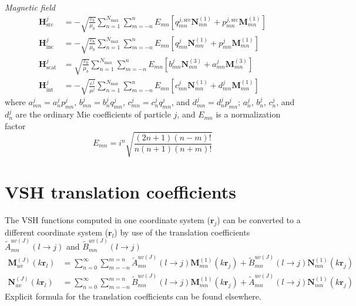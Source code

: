 \documentclass[11pt]{article}
\begin{document}
\textit{Magnetic field}
\begin{subequations}
\begin{align}
    \boldsymbol{H}_\text{src}^j &= - \sqrt{\frac{\varepsilon_b}{\mu_b}} \sum_{n=1}^{N_\text{max}} \sum_{m=-n}^{n}
    E_{mn} \left[ q_{mn}^{j,\text{src}} \boldsymbol{N}_{mn}^{(1)} + p_{mn}^{j,\text{src}} \boldsymbol{M}_{mn}^{(1)} \right] \\
    \boldsymbol{H}_\text{inc}^j &= - \sqrt{\frac{\varepsilon_b}{\mu_b}} \sum_{n=1}^{N_\text{max}} \sum_{m=-n}^{n}
    E_{mn} \left[ q_{mn}^j \boldsymbol{N}_{mn}^{(1)} + p_{mn}^j \boldsymbol{M}_{mn}^{(1)} \right] \\
    \boldsymbol{H}_\text{scat}^j &= \sqrt{\frac{\varepsilon_b}{\mu_b}} \sum_{n=1}^{N_\text{max}} \sum_{m=-n}^{n}
    E_{mn} \left[b_{mn}^j \boldsymbol{N}_{mn}^{(3)} + a_{mn}^j \boldsymbol{M}_{mn}^{(3)} \right] \\
    \boldsymbol{H}_\text{int}^j &= -\sqrt{\frac{\varepsilon^j}{\mu^j}}  \sum_{n=1}^{N_\text{max}} \sum_{m=-n}^{n}
    E_{mn} \left[ c_{mn}^j \boldsymbol{N}_{mn}^{(1)} + d_{mn}^j \boldsymbol{M}_{mn}^{(1)} \right]
\end{align}
\end{subequations}
where $a_{mn}^j = a_n^j p_{mn}^j$, $b_{mn}^j = b_n^j q_{mn}^j$, $c_{mn}^j = c_n^j q_{mn}^j$, and $d_{mn}^j = d_n^j p_{mn}^j$; $a_n^j$, $b_n^j$, $c_n^j$, and $d_n^j$ are the ordinary Mie coefficients \cite{bohren2008absorption} of particle $j$, and $E_{mn}$ is a normalization factor
\begin{equation}
    E_{mn} = i^n \sqrt{\frac{(2n+1)(n-m)!}{n(n+1)(n+m)!}}
\end{equation}

\section{VSH translation coefficients}
The VSH functions computed in one coordinate system ($\bm{r}_j$) can be converted to a different coordinate system ($\bm{r}_l$) by use of the translation coefficients $\widetilde{A}_{mn}^{uv(J)}(l \rightarrow j)$ and $\widetilde{B}_{mn}^{uv(J)}(l \rightarrow j)$
\begin{subequations}
\begin{align}
    \bm{M}_{uv}^{(J)}(k\bm{r}_l) &= \sum_{n=0}^\infty \sum_{m=-n}^{m=n}
    \widetilde{A}_{mn}^{uv(J)}(l \rightarrow j) \bm{M}_{mn}^{(1)}(k\bm{r}_j)
    + \widetilde{B}_{mn}^{uv(J)}(l \rightarrow j) \bm{N}_{mn}^{(1)}(k\bm{r}_j) \\
    \bm{N}_{uv}^{(J)}(k\bm{r}_l) &= \sum_{n=0}^\infty \sum_{m=-n}^{m=n}
    \widetilde{B}_{mn}^{uv(J)}(l \rightarrow j) \bm{M}_{mn}^{(1)}(k\bm{r}_j)
    + \widetilde{A}_{mn}^{uv(J)}(l \rightarrow j) \bm{N}_{mn}^{(1)}(k\bm{r}_j)
\end{align}
\end{subequations}
Explicit formula for the translation coefficients can be found elsewhere. \cite{Xu_1998}
\end{document}
